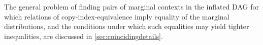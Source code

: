 \documentclass[aps,english,superscriptaddress,onecolumn,twoside,longbibliography,pra,floatfix,fleqn,nofootinbib]{revtex4-1}%
\theoremstyle{definition}
\newcommand{\p}[2][]{{P_{#1}}\parenths{#2}}
\DeclarePairedDelimiter{\parenths}{\lparen}{\rparen}
\DeclarePairedDelimiter{\braces}{\lbrace}{\rbrace}
\newcommand{\brackets}[1]{\braces*{#1}}
\begin{document}
The general problem of finding pairs of marginal contexts in the inflated DAG for which relations of copy-index-equivalence imply equality of the marginal distributions, and the conditions under which such equalities may yield tighter inequalities, are discussed in \cref{sec:coincidingdetails}.









\end{document}

